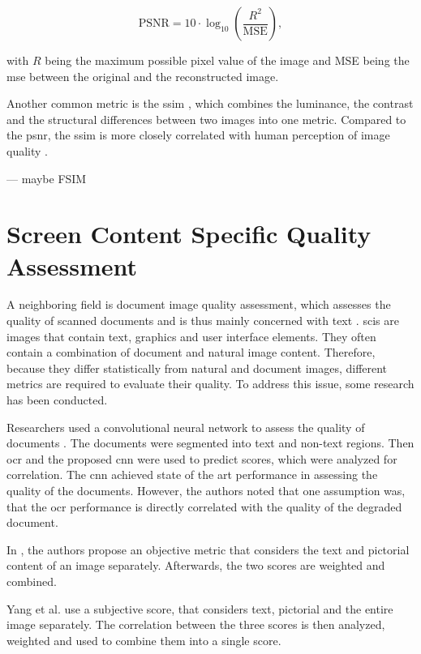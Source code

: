 \begin{equation}
    \text{PSNR} = 10 \cdot \log_{10} \left( \frac{R^2}{\text{MSE}} \right),
    \label{eq:psnr}
\end{equation}

with \(R\) being the maximum possible pixel value of the image and MSE being the \gls{mse} between the original and the reconstructed image.

Another common metric is the \gls{ssim} \cite{SSIM_2004}, which combines the luminance, the contrast and the structural differences between two images into one metric.
Compared to the \gls{psnr}, the \gls{ssim} is more closely correlated with human perception of image quality \cite{frmetric_comp_2012}.

--- maybe FSIM


\section{Screen Content Specific Quality Assessment}

A neighboring field is document image quality assessment, which assesses the quality of scanned documents and is thus mainly concerned with text \cite{3_subj_weight_2015}.
\Glspl{sci} are images that contain text, graphics and user interface elements.
They often contain a combination of document and natural image content.
Therefore, because they differ statistically from natural and document images, different metrics are required to evaluate their quality.
To address this issue, some research has been conducted.

Researchers used a convolutional neural network to assess the quality of documents \cite{ocr_cnn_docu_2014}.
The documents were segmented into text and non-text regions.
Then \gls{ocr} and the proposed \gls{cnn} were used to predict scores, which were analyzed for correlation.
The \gls{cnn} achieved state of the art performance in assessing the quality of the documents.
However, the authors noted that one assumption was, that the \gls{ocr} performance is directly correlated with the quality of the degraded document.

In \cite{text_pict_weight_2017}, the authors propose an objective metric that considers the text and pictorial content of an image separately.
Afterwards, the two scores are weighted and combined.

Yang et al. \cite{3_subj_weight_2015} use a subjective score, that considers text, pictorial and the entire image separately.
The correlation between the three scores is then analyzed, weighted and used to combine them into a single score.

